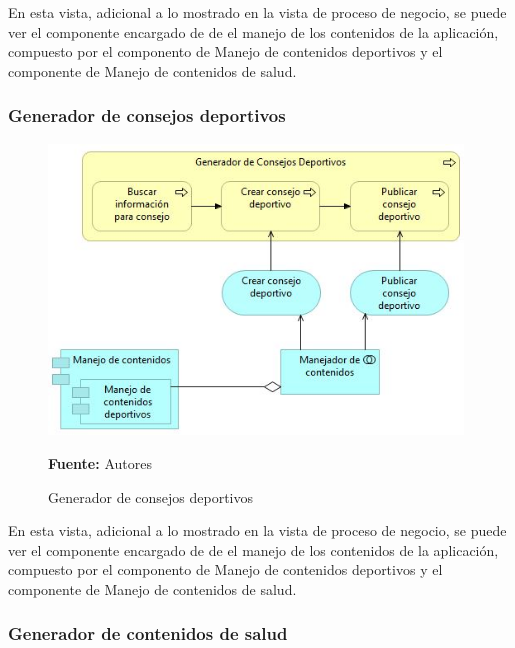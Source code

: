 En esta vista, adicional a lo mostrado en la vista de proceso de negocio, se puede ver el componente encargado de de el manejo de los contenidos de la aplicación, compuesto por el componento de Manejo de contenidos deportivos y el componente de Manejo de contenidos de salud.

\subsubsection{Generador de consejos deportivos}

\begin{figure}[!htb]
  \begin{center}
    \includegraphics[width=11cm]{./imagenes/Archimate/vistas/application_usage/generadorconsejosdeportivos.png}
    \caption{Generador de consejos deportivos}
    \label{fig:BP_GeneradorConsejosDeportivos}
    \textbf{Fuente:}  Autores
  \end{center}
\end{figure}

En esta vista, adicional a lo mostrado en la vista de proceso de negocio, se puede ver el componente encargado de de el manejo de los contenidos de la aplicación, compuesto por el componento de Manejo de contenidos deportivos y el componente de Manejo de contenidos de salud.

\subsubsection{Generador de contenidos de salud}

